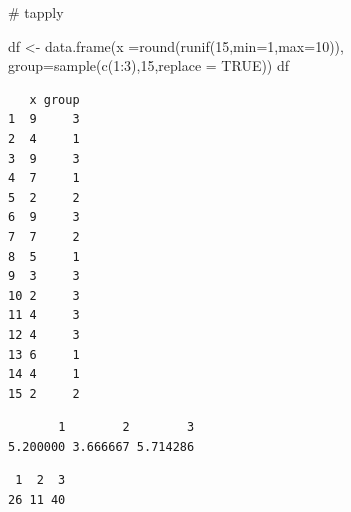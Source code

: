 \documentclass[
  letterpaper,
  DIV=11,
  numbers=noendperiod]{scrreprt}
\newenvironment{Shaded}{\begin{snugshade}}{\end{snugshade}}
\newcommand{\AttributeTok}[1]{\textcolor[rgb]{0.40,0.45,0.13}{#1}}
\newcommand{\CommentTok}[1]{\textcolor[rgb]{0.37,0.37,0.37}{#1}}
\newcommand{\ConstantTok}[1]{\textcolor[rgb]{0.56,0.35,0.01}{#1}}
\newcommand{\DecValTok}[1]{\textcolor[rgb]{0.68,0.00,0.00}{#1}}
\newcommand{\FunctionTok}[1]{\textcolor[rgb]{0.28,0.35,0.67}{#1}}
\newcommand{\NormalTok}[1]{\textcolor[rgb]{0.00,0.23,0.31}{#1}}
\newcommand{\OtherTok}[1]{\textcolor[rgb]{0.00,0.23,0.31}{#1}}
\newcommand{\SpecialCharTok}[1]{\textcolor[rgb]{0.37,0.37,0.37}{#1}}
\begin{document}
\begin{Shaded}
\begin{Highlighting}[]
\CommentTok{\# tapply}

\NormalTok{df }\OtherTok{\textless{}{-}} \FunctionTok{data.frame}\NormalTok{(}\AttributeTok{x =}\FunctionTok{round}\NormalTok{(}\FunctionTok{runif}\NormalTok{(}\DecValTok{15}\NormalTok{,}\AttributeTok{min=}\DecValTok{1}\NormalTok{,}\AttributeTok{max=}\DecValTok{10}\NormalTok{)),}
                 \AttributeTok{group=}\FunctionTok{sample}\NormalTok{(}\FunctionTok{c}\NormalTok{(}\DecValTok{1}\SpecialCharTok{:}\DecValTok{3}\NormalTok{),}\DecValTok{15}\NormalTok{,}\AttributeTok{replace =} \ConstantTok{TRUE}\NormalTok{))}
\NormalTok{df}
\end{Highlighting}
\end{Shaded}

\begin{verbatim}
   x group
1  9     3
2  4     1
3  9     3
4  7     1
5  2     2
6  9     3
7  7     2
8  5     1
9  3     3
10 2     3
11 4     3
12 4     3
13 6     1
14 4     1
15 2     2
\end{verbatim}

\begin{Shaded}
\end{Shaded}

\begin{verbatim}
       1        2        3 
5.200000 3.666667 5.714286 
\end{verbatim}

\begin{Shaded}
\end{Shaded}

\begin{verbatim}
 1  2  3 
26 11 40 
\end{verbatim}

\begin{Shaded}
\end{Shaded}
\end{document}
